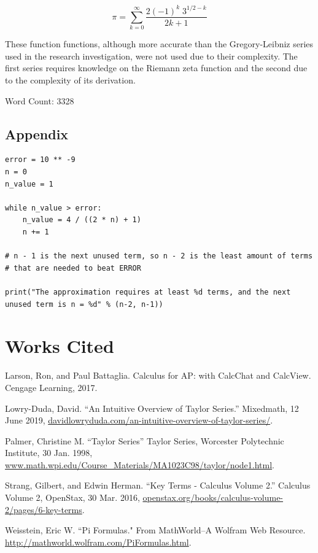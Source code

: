 \documentclass[12pt, titlepage]{article}
\begin{document}
\begin{equation}
    \pi = \sum_{k=0}^{\infty} \frac{2(-1)^{k} \; 3^{1/2-k}}{{2k+1}}
\end{equation}

These function functions, although more accurate than the Gregory-Leibniz series used in the research investigation, were not used due to their complexity. The first series requires knowledge on the Riemann zeta function and the second due to the complexity of its derivation.

Word Count: 3328

\pagebreak
\begin{appendix}
\section{Appendix}
\begin{verbatim}
error = 10 ** -9
n = 0
n_value = 1

while n_value > error:
    n_value = 4 / ((2 * n) + 1)
    n += 1

# n - 1 is the next unused term, so n - 2 is the least amount of terms 
# that are needed to beat ERROR

print("The approximation requires at least %d terms, and the next
unused term is n = %d" % (n-2, n-1))
\end{verbatim}
\end{appendix}

\pagebreak
\section{Works Cited}

Larson, Ron, and Paul Battaglia. Calculus for AP: with CalcChat and CalcView. Cengage Learning, 2017.

Lowry-Duda, David. ``An Intuitive Overview of Taylor Series.” Mixedmath, 12 June 2019, \url{davidlowryduda.com/an-intuitive-overview-of-taylor-series/}.

Palmer, Christine M. ``Taylor Series” Taylor Series, Worcester Polytechnic Institute, 30 Jan. 1998, \url{www.math.wpi.edu/Course_Materials/MA1023C98/taylor/node1.html}.

Strang, Gilbert, and Edwin Herman. ``Key Terms - Calculus Volume 2.” Calculus Volume 2, OpenStax, 30 Mar. 2016, \url{openstax.org/books/calculus-volume-2/pages/6-key-terms}.

Weisstein, Eric W. ``Pi Formulas." From MathWorld--A Wolfram Web Resource. \url{http://mathworld.wolfram.com/PiFormulas.html}.
\end{document}
